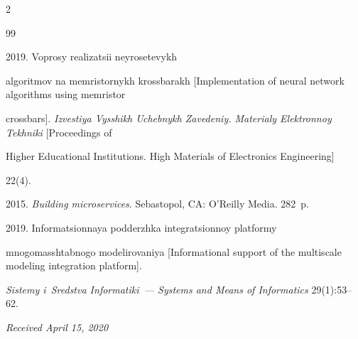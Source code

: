 \begin{multicols}{2}
{{\begin{thebibliography}{99}


 2019. Voprosy realizatsii neyrosetevykh 


algoritmov na memristornykh krossbarakh [Implementation of neural network algorithms using memristor 


crossbars]. \textit{Izvestiya Vysshikh Uchebnykh Zavedeniy. Materialy Elektronnoy Tekhniki } [Proceedings of 


Higher Educational Institutions. High Materials of Electronics Engineering] 


22(4). %






 2015. \textit{Building microservices}. Sebastopol, CA: O'Reilly Media. 282~p.




 2019. In\-for\-ma\-tsi\-on\-naya podderzhka integratsionnoy platformy 


mnogomasshtabnogo modelirovaniya [Informational support of the multiscale modeling integration platform]. 


\textit{Sistemy i~Sredstva Informatiki~--- Systems and Means of Informatics} 29(1):53--62.


\end{thebibliography}





 }


 }





\end{multicols}





\vspace*{-6pt}





\hfill{\small\textit{Received April 15, 2020}}





















